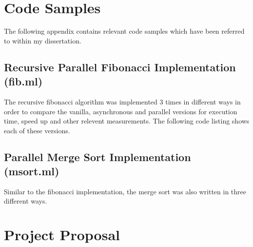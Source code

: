 \documentclass[12pt,twoside,notitlepage]{report}
\begin{document}

\appendix
\chapter{Code Samples}
\label{chap:code_samples}
The following appendix contains relevant code samples which have been referred to within my dissertation.

\section{Recursive Parallel Fibonacci Implementation (fib.ml)}
The recursive fibonacci algorithm was implemented 3 times in different ways in order to compare the vanilla, asynchronous and parallel versions for execution time, speed up and other relevent measurements. The following code listing
shows each of these versions.


\section{Parallel Merge Sort Implementation (msort.ml)}
Similar to the fibonacci implementation, the merge sort was also written in three different ways.


\chapter{Project Proposal}
\label{chap:proposal}

\end{document}
